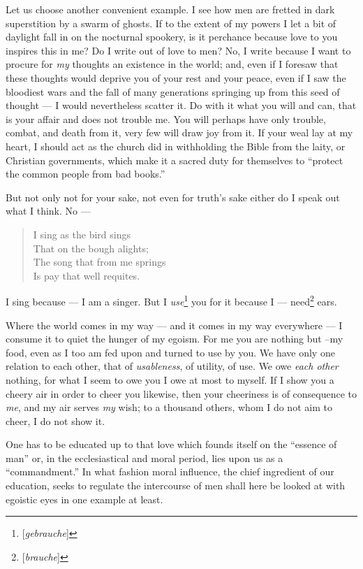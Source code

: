 Let us choose another convenient example. I see how men are fretted in dark 
superstition by a swarm of ghosts. If to the extent of my powers I let a bit 
of daylight fall in on the nocturnal spookery, is it perchance because love to 
you inspires this in me? Do I write out of love to men? No, I write because I 
want to procure for \textit{my} thoughts an existence in the world; and, even 
if I foresaw that these thoughts would deprive you of your rest and your 
peace, even if I saw the bloodiest wars and the fall of many generations 
springing up from this seed of thought --- I would nevertheless scatter it. Do 
with it what you will and can, that is your affair and does not trouble me. 
You will perhaps have only trouble, combat, and death from it, very few will 
draw joy from it. If your weal lay at my heart, I should act as the church did 
in withholding the Bible from the laity, or Christian governments, which make 
it a sacred duty for themselves to ``protect the common people from bad 
books.''

But not only not for your sake, not even for truth's sake either do I speak 
out what I think. No ---

\begin{quotation}

\noindent{}I sing as the bird sings\\
 That on the bough alights;\\
 The song that from me springs\\
 Is pay that well requites.\end{quotation}

\noindent{}I sing because --- I am a singer. But I 
\textit{use}\footnote{[\textit{gebrauche}]} you for it because I --- need\footnote{[\textit{brauche}]} ears.

Where the world comes in my way --- and it comes in my way everywhere --- I 
consume it to quiet the hunger of my egoism. For me you are nothing but --my 
food, even as I too am fed upon and turned to use by you. We have only one 
relation to each other, that of \textit{usableness}, of utility, of use. We 
owe \textit{each other} nothing, for what I seem to owe you I owe at most to 
myself. If I show you a cheery air in order to cheer you likewise, then your 
cheeriness is of consequence to \textit{me}, and my air serves \textit{my} 
wish; to a thousand others, whom I do not aim to cheer, I do not show it.

\myhrule

One has to be educated up to that love which founds itself on the ``essence 
of man'' or, in the ecclesiastical and moral period, lies upon us as a 
``commandment.'' In what fashion moral influence, the chief ingredient of 
our education, seeks to regulate the intercourse of men shall here be looked 
at with egoistic eyes in one example at least.

